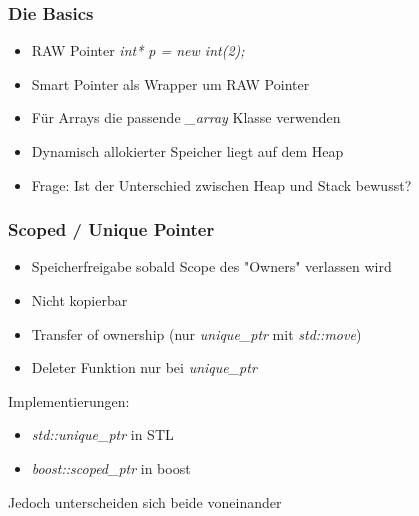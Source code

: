 \documentclass{beamer}
\begin{document}

\begin{frame}
  \frametitle{Die Basics}
  \begin{itemize}
    \item RAW Pointer \textit{int* p = new int(2);}
    \item Smart Pointer als Wrapper um RAW Pointer
    \item Für Arrays die passende \textit{\_array} Klasse verwenden
    \item Dynamisch allokierter Speicher liegt auf dem Heap
    \item Frage: Ist der Unterschied zwischen Heap und Stack bewusst?
  \end{itemize}	
\end{frame}


\begin{frame}[fragile]
 \frametitle{Scoped / Unique Pointer}
 \begin{itemize}
  \item Speicherfreigabe sobald Scope des "Owners" verlassen wird
  \item Nicht kopierbar
  \item Transfer of ownership \tiny (nur \textit{unique\_ptr} mit \textit{std::move})
  \item \normalsize Deleter Funktion nur bei \textit{unique\_ptr}
 \end{itemize}
 Implementierungen:
 \begin{itemize}
 	\item \textit{std::unique\_ptr} in STL
 	\item \textit{boost::scoped\_ptr} in boost
 \end{itemize}
 Jedoch unterscheiden sich beide voneinander
\end{frame}
\end{document}
